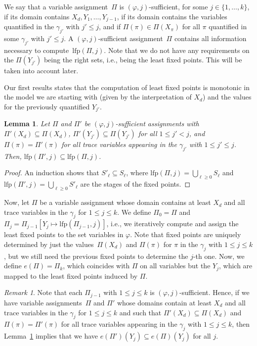 \documentclass[dvipsnames,10pt,a4paper]{amsart}
\newtheorem{lem}[thm]{Lemma}
\theoremstyle{definition}
\theoremstyle{remark}
\newtheorem{rem}[thm]{Remark}
\renewcommand{\phi}{\varphi}
\newcommand{\set}[1]{\{#1\}}
\newcommand{\unidisvar}{X_d}
\newcommand{\lfp}{\mathrm{lfp}}
\newcommand{\itereval}{e}
\begin{document}
We say that a variable assignment~$\Pi$ is $(\phi,j)$-sufficient, for some $j \in \set{1, \ldots, k}$, if its domain contains $\unidisvar,Y_1, \ldots, Y_{j-1}$, if its domain contains the variables quantified in the $\gamma_{j'}$ with $j' \le j$, and if $\Pi(\pi) \in \Pi(X_\pi)$ for all $\pi$ quantified in some $\gamma_{j'}$ with $j' \le j$.
A $(\phi,j)$-sufficient assignment~$\Pi$ contains all information necessary to compute~$\lfp(\Pi, j)$.
Note that we do not have any requirements on the $\Pi(Y_{j'})$ being the right sets, i.e., being the least fixed points.
This will be taken into account later. 

Our first results states that the computation of least fixed points is monotonic in the model we are starting with (given by the interpretation of $\unidisvar$) and the values for the previously quantified $Y_{j'}$.

\begin{lem}
\label{lemma:lfpmono}
Let $\Pi$ and $\Pi'$ be $(\phi, j)$-sufficient assignments with $\Pi'(\unidisvar) \subseteq \Pi(\unidisvar)$, $\Pi'(Y_{j'}) \subseteq \Pi(Y_{j'})$ for all $1 \le j' < j$, and $\Pi(\pi) = \Pi'(\pi)$ for all trace variables appearing in the $\gamma_{j'}$ with $1 \le j' \le j$.
Then, $\lfp(\Pi',j) \subseteq \lfp(\Pi,j)$.
\end{lem}

\begin{proof}
An induction shows that $S'_\ell \subseteq S_\ell$, where $\lfp(\Pi, j) = \bigcup_{\ell\ge 0} S_\ell$ and $\lfp(\Pi', j) = \bigcup_{\ell\ge 0} S'_\ell$ are the stages of the fixed points.
\end{proof}

Now, let $\Pi$ be a variable assignment whose domain contains at least $\unidisvar$ and all trace variables in the $\gamma_j$ for $1 \le j \le k$.
We define $\Pi_0 = \Pi$ and $\Pi_j = \Pi_{j-1}[Y_j \mapsto \lfp(\Pi_{j-1},j)]$, i.e., we iteratively compute and assign the least fixed points to the set variables in $\phi$.
Note that fixed points are uniquely determined by just the values~$\Pi(\unidisvar)$ and $\Pi(\pi)$ for $\pi$ in the $\gamma_j$ with $1\le j \le k$, but we still need the previous fixed points to determine the $j$-th one. 
Now, we define $\itereval(\Pi) = \Pi_k$, which coincides with $\Pi$ on all variables but the $Y_j$, which are mapped to the least fixed points induced by $\Pi$.

\begin{rem}
\label{remark:lfpmonoiter}
Note that each $\Pi_{j-1}$ with $1 \le j \le k$ is $(\phi,j)$-sufficient.
Hence, if we have variable assignments~$\Pi$ and $\Pi'$ whose domains contain at least $\unidisvar$ and all trace variables in the $\gamma_j$ for $1 \le j \le k$ and such that $\Pi'(\unidisvar) \subseteq \Pi(\unidisvar)$ and $\Pi(\pi) = \Pi'(\pi)$ for all trace variables appearing in the $\gamma_{j}$ with $1 \le j \le k$, then Lemma~\ref{lemma:lfpmono} implies that we have $\itereval(\Pi')(Y_j) \subseteq \itereval(\Pi)(Y_j)$ for all $j$.
\end{rem}
\end{document}
